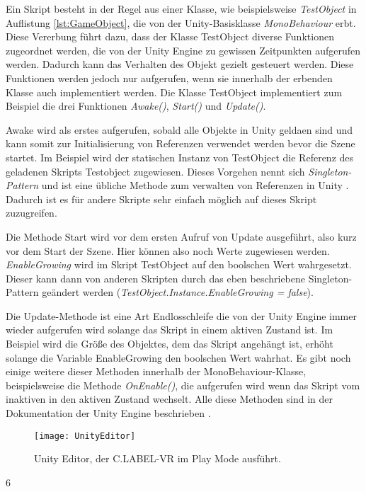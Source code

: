 Ein Skript besteht in der Regel aus einer Klasse, wie beispielsweise \textit{TestObject} in Auflistung \ref{lst:GameObject}, die von der Unity-Basisklasse \textit{MonoBehaviour} erbt. Diese Vererbung führt dazu, dass der Klasse TestObject diverse Funktionen zugeordnet werden, die von der Unity Engine zu gewissen Zeitpunkten aufgerufen werden. Dadurch kann das Verhalten des Objekt gezielt gesteuert werden. Diese Funktionen werden jedoch nur aufgerufen, wenn sie innerhalb der erbenden Klasse auch implementiert werden. Die Klasse TestObject implementiert zum Beispiel die drei Funktionen \textit{Awake()}, \textit{Start()} und \textit{Update()}.

Awake wird als erstes aufgerufen, sobald alle Objekte in Unity geldaen sind und kann somit zur Initialisierung von Referenzen verwendet werden bevor die Szene startet. Im Beispiel wird der statischen Instanz von TestObject die Referenz des geladenen Skripts Testobject zugewiesen. Dieses Vorgehen nennt sich \textit{Singleton-Pattern} und ist eine übliche Methode zum verwalten von Referenzen in Unity \cite{bib:Singleton}. Dadurch ist es für andere Skripte sehr einfach möglich auf dieses Skript zuzugreifen.

Die Methode Start wird vor dem ersten Aufruf von Update ausgeführt, also kurz vor dem Start der Szene. Hier können also noch Werte zugewiesen werden. \textit{EnableGrowing} wird im Skript TestObject auf den boolschen Wert \glqq wahr\grqq gesetzt. Dieser kann dann von anderen Skripten durch das eben beschriebene Singleton-Pattern geändert werden (\textit{TestObject.Instance.EnableGrowing = false}).  

Die Update-Methode ist eine Art Endlosschleife die von der Unity Engine immer wieder aufgerufen wird solange das Skript in einem aktiven Zustand ist. Im Beispiel wird die Größe des Objektes, dem das Skript angehängt ist, erhöht solange die Variable EnableGrowing den boolschen Wert \glqq wahr\grqq hat. Es gibt noch einige weitere dieser Methoden innerhalb der MonoBehaviour-Klasse, beispielsweise die Methode \textit{OnEnable()}, die aufgerufen wird wenn das Skript vom inaktiven in den aktiven Zustand wechselt. Alle diese Methoden sind in der Dokumentation der Unity Engine beschrieben \cite{bib:MonoBehaviour}.


\begin{figure}%
	\centering
    \texttt{[image: UnityEditor]}
    \caption{Unity Editor, der C.LABEL-VR im Play Mode ausführt.}
    \label{fig:UnityEditor}
\end{figure}6

